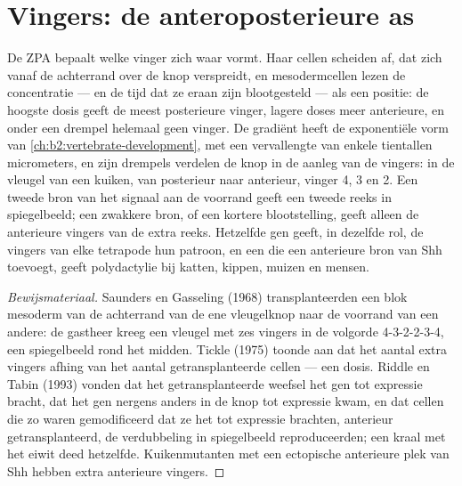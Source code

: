 \section{Vingers: de anteroposterieure as}

\begin{proposition}\label{prop:b2:limb-organogenesis:zpa}
De ZPA bepaalt welke vinger zich waar vormt. Haar cellen scheiden  af, dat zich vanaf de achterrand over de knop verspreidt, en
mesodermcellen lezen de concentratie --- en de tijd dat ze eraan zijn
blootgesteld --- als een positie: de hoogste dosis geeft de meest
posterieure vinger, lagere doses meer anterieure, en onder een drempel
helemaal geen vinger. De gradiënt heeft de exponentiële vorm van
\cref{ch:b2:vertebrate-development}, met een vervallengte van enkele
tientallen micrometers, en zijn drempels verdelen de knop in de aanleg van
de vingers: in de vleugel van een kuiken, van posterieur naar anterieur,
vinger 4, 3 en 2. Een tweede bron van het signaal aan de voorrand geeft een
tweede reeks in spiegelbeeld; een zwakkere bron, of een kortere
blootstelling, geeft alleen de anterieure vingers van de extra reeks.
Hetzelfde gen geeft, in dezelfde rol, de vingers van elke tetrapode hun
patroon, en een  die een anterieure bron van
Shh toevoegt, geeft polydactylie bij katten, kippen, muizen en mensen.
\end{proposition}
\begin{proof}[Bewijsmateriaal]
Saunders en Gasseling (1968) transplanteerden een blok mesoderm van de
achterrand van de ene vleugelknop naar de voorrand van een andere: de
gastheer kreeg een vleugel met zes vingers in de volgorde 4-3-2-2-3-4, een
spiegelbeeld rond het midden. Tickle (1975) toonde aan dat het aantal extra
vingers afhing van het aantal getransplanteerde cellen --- een dosis.
Riddle en Tabin (1993) vonden dat het getransplanteerde weefsel het gen
\emph{} tot expressie bracht, dat het gen nergens anders in de
knop tot expressie kwam, en dat cellen die zo waren gemodificeerd dat ze het
tot expressie brachten, anterieur getransplanteerd, de verdubbeling in
spiegelbeeld reproduceerden; een kraal met het eiwit deed hetzelfde.
Kuikenmutanten met een ectopische anterieure plek van Shh hebben extra
anterieure vingers.
\end{proof}

